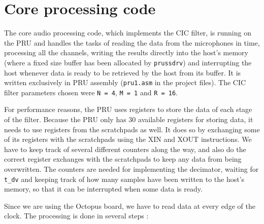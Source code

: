 \documentclass[]{report}
\begin{document}
\hypertarget{core-processing-code}{%
\section{Core processing code}\label{core-processing-code}}

The core audio processing code, which implements the CIC filter, is
running on the PRU and handles the tasks of reading the data from the
microphones in time, processing all the channels, writing the results
directly into the host's memory (where a fixed size buffer has been
allocated by \texttt{prussdrv}) and interrupting the host whenever data
is ready to be retrieved by the host from its buffer. It is written
exclusively in PRU assembly (\texttt{pru1.asm} in the project files).
The CIC filter parameters chosen were \texttt{N\ =\ 4}, \texttt{M\ =\ 1}
and \texttt{R\ =\ 16}.

For performance reasons, the PRU uses registers to store the data of
each stage of the filter. Because the PRU only has 30 available
registers for storing data, it needs to use registers from the
scratchpads as well. It does so by exchanging some of its registers with
the scratchpads using the XIN and XOUT instructions. We have to keep
track of several different counters along the way, and also do the
correct register exchanges with the scratchpads to keep any data from
being overwritten. The counters are needed for implementing the
decimator, waiting for \texttt{t\_dv} and keeping track of how many
samples have been written to the host's memory, so that it can be
interrupted when some data is ready.

Since we are using the Octopus board, we have to read data at every edge
of the clock. The processing is done in several steps :
\end{document}
